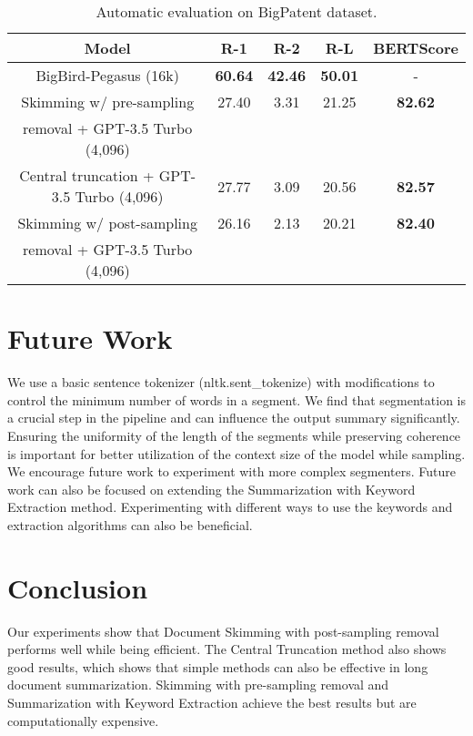 \documentclass[letterpaper]{article} %
\begin{document}
	\begin{table}[!ht]
		\centering
		\tiny

		\begin{tabular}{c c c c c}
			\hline
			Model & R-1 & R-2 & R-L & BERTScore \\
			\hline
			BigBird-Pegasus (16k) & \textbf{60.64} & \textbf{42.46} & \textbf{50.01} & - \\
			\hline
			Skimming w/ pre-sampling & 27.40 & 3.31 & 21.25 & \textbf{82.62} \\
			removal + GPT-3.5 Turbo (4,096) & & & & \\
			Central truncation + GPT-3.5 Turbo (4,096) & 27.77 & 3.09 & 20.56 & \textbf{82.57} \\
			Skimming w/ post-sampling & 26.16 & 2.13 & 20.21 & \textbf{82.40} \\
			removal + GPT-3.5 Turbo (4,096) & & & & \\
			\hline
		\end{tabular}

		\caption{Automatic evaluation on BigPatent dataset.}
		\label{tab:bigpatent}
	\end{table}


\section{Future Work}

	We use a basic sentence tokenizer (nltk.sent\_tokenize) with modifications to control
	the minimum number of words in a segment.
	We find that segmentation is a crucial step in the pipeline and can influence the output
	summary significantly.
	Ensuring the uniformity of the length of the segments while preserving coherence is
	important for better utilization of the context size of the model while sampling.
	We encourage future work to experiment with more complex segmenters.
	Future work can also be focused on extending the Summarization with Keyword Extraction method.
	Experimenting with different ways to use the keywords and extraction algorithms can also be
	beneficial.


\section{Conclusion}

	Our experiments show that Document Skimming with post-sampling removal performs well while
	being efficient.
	The Central Truncation method also shows good results, which shows that simple methods can
	also be effective in long document summarization.
	Skimming with pre-sampling removal and Summarization with Keyword Extraction achieve the best
	results but are computationally expensive.
\end{document}
